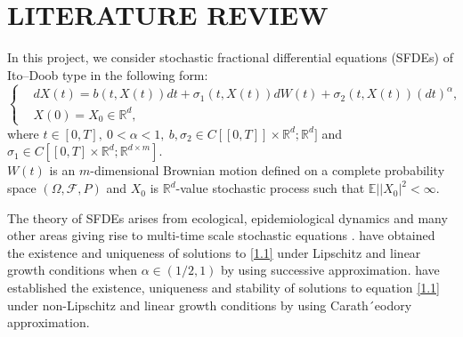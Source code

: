 \documentclass[a4 paper, 12pt]{report}
\theoremstyle{plain}
\begin{document}
\chapter{LITERATURE REVIEW}
In this project, we consider stochastic fractional differential equations (SFDEs) of
It$\hat{\mbox{o}}$–Doob type in the following form:
\begin{equation}\label{1.1}
\left\{
\begin{split}
&dX(t) = b(t,X(t))dt+\sigma_1(t,X(t))dW(t)+\sigma_2(t,X(t))(dt)^\alpha,\\
&X(0) = X_0\in\mathbb{R}^d,
\end{split}
\right.
\end{equation}
where $t\in[0,T],~0<\alpha<1,~b,\sigma_2\in C[[0,T]]\times \mathbb{R}^d;\mathbb{R}^d]$ and $\sigma_1\in C[[0,T]\times \mathbb{R}^d;\mathbb{R}^{d\times m}]$.\\
$W(t)$ is an $m$-dimensional Brownian motion defined on a complete probability space $(\Omega,\mathcal{F},P)$ and $X_0$ is $\mathbb{R}^d$-value stochastic process such that $\mathbb{E}||X_0|^2<\infty.$\\

\par The theory of SFDEs arises from ecological, epidemiological dynamics and many
other areas giving rise to multi-time scale stochastic equations \cite{12}. \cite{12} have obtained the existence and uniqueness of solutions to \eqref{1.1}
under Lipschitz and linear growth conditions when $\alpha\in(1/2,1)$  by using successive
approximation. \cite{1} have established the existence, uniqueness and
stability of solutions to equation \eqref{1.1} under \cite{26} non-Lipschitz and linear
growth conditions by using Carath´eodory approximation.\\
\end{document}
